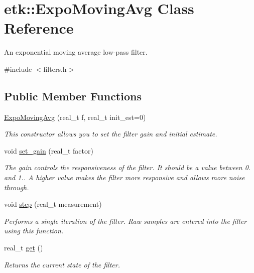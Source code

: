 \hypertarget{classetk_1_1_expo_moving_avg}{\section{etk\-:\-:Expo\-Moving\-Avg Class Reference}
\label{classetk_1_1_expo_moving_avg}
}


An exponential moving average low-\/pass filter.  




{\ttfamily \#include $<$filters.\-h$>$}

\subsection*{Public Member Functions}
\begin{DoxyCompactItemize}
\item 
\hyperlink{classetk_1_1_expo_moving_avg_a5194c9b3142d409ae109b66285c4fa60}{Expo\-Moving\-Avg} (real\-\_\-t f, real\-\_\-t init\-\_\-est=0)
\begin{DoxyCompactList}\small\item\em This constructor allows you to set the filter gain and initial estimate. \end{DoxyCompactList}\item 
void \hyperlink{classetk_1_1_expo_moving_avg_a772862fd59a243bba42d244311ee2643}{set\-\_\-gain} (real\-\_\-t factor)
\begin{DoxyCompactList}\small\item\em The gain controls the responsiveness of the filter. It should be a value between 0. and 1.. A higher value makes the filter more responsive and allows more noise through. \end{DoxyCompactList}\item 
void \hyperlink{classetk_1_1_expo_moving_avg_a9e769e6b6f298d99f4329e1155fbe8bd}{step} (real\-\_\-t measurement)
\begin{DoxyCompactList}\small\item\em Performs a single iteration of the filter. Raw samples are entered into the filter using this function. \end{DoxyCompactList}\item 
\hypertarget{classetk_1_1_expo_moving_avg_a9a0fd1042f0a73282e3dbd4ef6d0353c}{real\-\_\-t \hyperlink{classetk_1_1_expo_moving_avg_a9a0fd1042f0a73282e3dbd4ef6d0353c}{get} ()}\label{classetk_1_1_expo_moving_avg_a9a0fd1042f0a73282e3dbd4ef6d0353c}

\begin{DoxyCompactList}\small\item\em Returns the current state of the filter. \end{DoxyCompactList}\end{DoxyCompactItemize}


